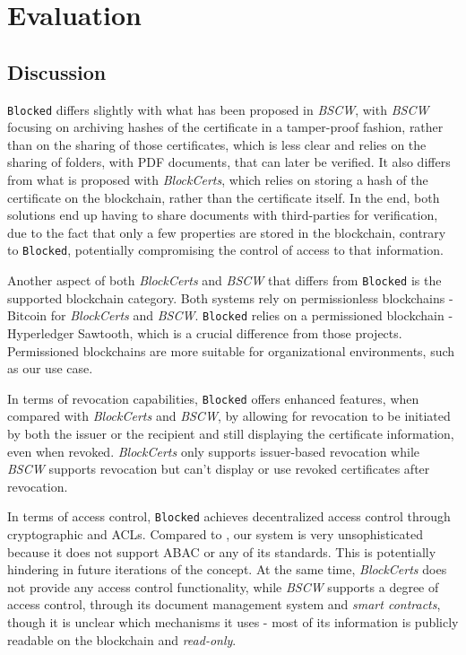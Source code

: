 \section{Evaluation}
\label{chap:evaluation}

\subsection{Discussion}
\label{sec:eval-analysis}

\texttt{Blocked} differs slightly with what has been proposed in \emph{BSCW}, with \emph{BSCW} focusing on archiving hashes of the certificate in a tamper-proof fashion, rather than on the sharing of those certificates, which is less clear and relies on the sharing of folders, with PDF documents, that can later be verified. It also differs from what is proposed with \emph{BlockCerts}, which relies on storing a hash of the certificate on the blockchain, rather than the certificate itself. In the end, both solutions end up having to share documents with third-parties for verification, due to the fact that only a few properties are stored in the blockchain, contrary to \texttt{Blocked}, potentially compromising the control of access to that information.

Another aspect of both \emph{BlockCerts} and \emph{BSCW} that differs from \texttt{Blocked} is the supported blockchain category. Both systems rely on permissionless blockchains - Bitcoin for \emph{BlockCerts} and \emph{BSCW}. \texttt{Blocked} relies on a permissioned blockchain - Hyperledger Sawtooth, which is a crucial difference from those projects. Permissioned blockchains are more suitable for organizational environments, such as our use case. 

In terms of revocation capabilities, \texttt{Blocked} offers enhanced features, when compared with \emph{BlockCerts} and \emph{BSCW}, by allowing for revocation to be initiated by both the issuer or the recipient and still displaying the certificate information, even when revoked. \emph{BlockCerts} only supports issuer-based revocation while \emph{BSCW} supports revocation but can't display or use revoked certificates after revocation.

In terms of access control, \texttt{Blocked} achieves decentralized access control through cryptographic and ACLs. Compared to \cite{maesa_blockchain_2017}, our system is very unsophisticated because it does not support ABAC or any of its standards. This is potentially hindering in future iterations of the concept. At the same time, \emph{BlockCerts} does not provide any access control functionality, while \emph{BSCW} supports a degree of access control, through its document management system and \emph{smart contracts}, though it is unclear which mechanisms it uses - most of its information is publicly readable on the blockchain and \emph{read-only}.

